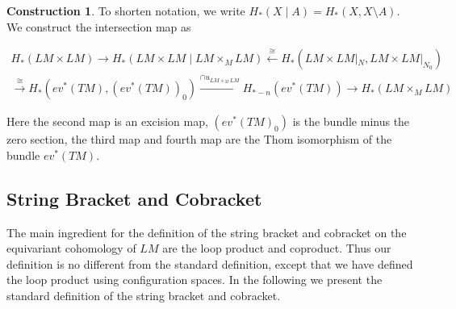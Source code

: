 \documentclass{scrartcl}
\theoremstyle{plain}
\theoremstyle{definition}
\newtheorem{construction}[theorem]{Construction}
\newcommand{\iso}{\cong}
\let\xto\xrightarrow
\let\xfrom\xleftarrow
\begin{document}
\begin{construction}
To shorten notation, we write $H_*(X \mid A) = H_*(X, X\setminus A)$. We construct the intersection map as 

\begin{align*}
    H_*(LM\times LM) \to H_*(LM\times LM \mid LM\times_M LM) \xfrom{\iso} H_*(LM\times LM |_N, LM\times LM|_{N_0}) \\ \xto{\iso} H_*(ev^*(TM), (ev^*(TM))_0) \xto{\cap u_{LM\times_M LM}} H_{*-n}(ev^*(TM)) \to H_*(LM\times_M LM)
\end{align*}

Here the second map is an excision map, $(ev^*(TM)_0)$ is the bundle minus the zero section, the third map and fourth map are the Thom isomorphism of the bundle $ev^*(TM)$.

\end{construction}


\subsection{String Bracket and Cobracket}
The main ingredient for the definition of the string bracket and cobracket on the equivariant cohomology of $LM$ are the loop product and coproduct. Thus our definition is no different from the standard definition, except that we have defined the loop product using configuration spaces. In the following we present the standard definition of the string bracket and cobracket.
\end{document}
